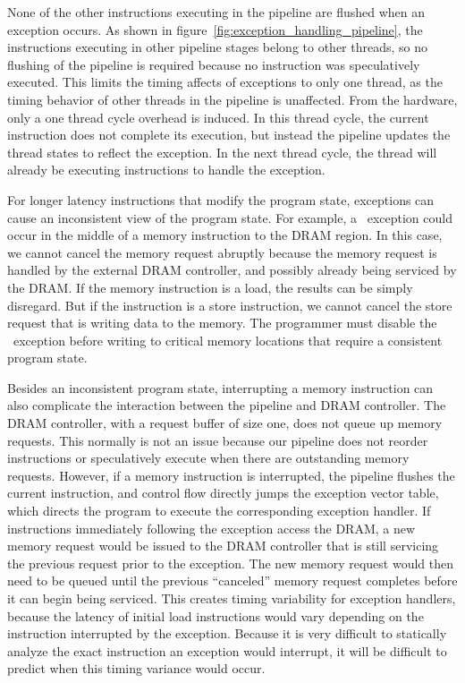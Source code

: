 None of the other instructions executing in the pipeline are flushed when an exception occurs. 
As shown in figure~\ref{fig:exception_handling_pipeline}, the instructions executing in other pipeline stages belong to other threads, so no flushing of the pipeline is required because no instruction was speculatively executed.
This limits the timing affects of exceptions to only one thread, as the timing behavior of other threads in the pipeline is unaffected.
From the hardware, only a one thread cycle overhead is induced. 
In this thread cycle, the current instruction does not complete its execution, but instead the pipeline updates the thread states to reflect the exception.   
In the next thread cycle, the thread will already be executing instructions to handle the exception.

For longer latency instructions that modify the program state, exceptions can cause an inconsistent view of the program state.
For example, a \timerexpired\ exception could occur in the middle of a memory instruction to the DRAM region.
In this case, we cannot cancel the memory request abruptly because the memory request is handled by the external DRAM controller, and possibly already being serviced by the DRAM.
If the memory instruction is a load, the results can be simply disregard.
But if the instruction is a store instruction, we cannot cancel the store request that is writing data to the memory.
The programmer must disable the \timerexpired\ exception before writing to critical memory locations that require a consistent program state.

Besides an inconsistent program state, interrupting a memory instruction can also complicate the interaction between the pipeline and DRAM controller.
The DRAM controller, with a request buffer of size one, does not queue up memory requests.
This normally is not an issue because our pipeline does not reorder instructions or speculatively execute when there are outstanding memory requests.
However, if a memory instruction is interrupted, the pipeline flushes the current instruction, and control flow directly jumps the exception vector table, which directs the program to execute the corresponding exception handler. 
If instructions immediately following the exception access the DRAM, a new memory request would be issued to the DRAM controller that is still servicing the previous request prior to the exception.
The new memory request would then need to be queued until the previous ``canceled'' memory request completes before it can begin being serviced.
This creates timing variability for exception handlers, because the latency of initial load instructions would vary depending on the instruction interrupted by the exception. 
Because it is very difficult to statically analyze the exact instruction an exception would interrupt, it will be difficult to predict when this timing variance would occur.    

